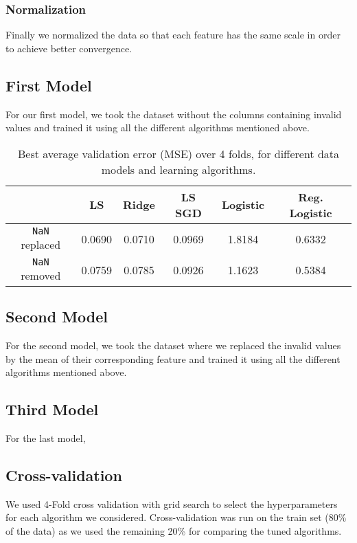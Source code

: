 \documentclass[10pt,conference,compsocconf]{IEEEtran}
\begin{document}
\subsubsection{Normalization}
Finally we normalized the data so that each feature has the same scale in order to achieve better convergence.

\subsection{First Model}
For our first model, we took the dataset without the columns containing invalid values and trained it using all the different algorithms mentioned above. \\
\begin{table}[h!]
  \begin{tabular}{ |c|c|c|c|c|c| } 
    \hline
     & LS & Ridge & LS SGD & Logistic & Reg. Logistic \\
    \hline
    \texttt{NaN} replaced & 0.0690 & 0.0710 & 0.0969 & 1.8184 & 0.6332 \\
    \texttt{NaN} removed  & 0.0759 & 0.0785 & 0.0926 & 1.1623 & 0.5384 \\
    \hline
  \end{tabular}

  \caption{Best average validation error (MSE) over 4 folds, for different data models and learning algorithms.}
  \label{tbl:validation}
\end{table}

\subsection{Second Model}
For the second model, we took the dataset where we replaced the invalid values by the mean of their corresponding feature and trained it using all the different algorithms mentioned above.

\subsection{Third Model}
For the last model,

\subsection{Cross-validation}
We used 4-Fold cross validation with grid search to select the hyperparameters for each algorithm we considered. Cross-validation was run on the train set (80\% of the data) as we used the remaining 20\% for comparing the tuned algorithms. 
\end{document}
